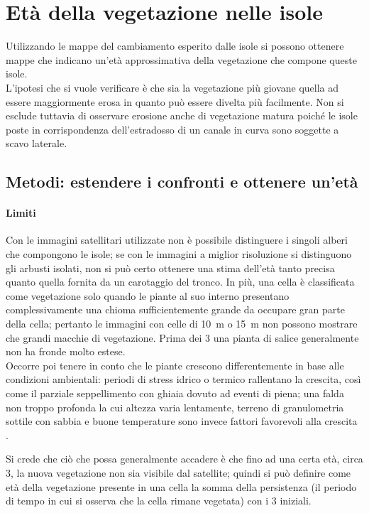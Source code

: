 \section{Età della vegetazione nelle isole}
Utilizzando le mappe del cambiamento esperito dalle isole si possono ottenere mappe che indicano un'età approssimativa della vegetazione che compone queste isole. 
\\
L'ipotesi che si vuole verificare è che sia la vegetazione più giovane quella ad essere maggiormente erosa in quanto può essere divelta più facilmente.
Non si esclude tuttavia di osservare erosione anche di vegetazione matura poiché le isole poste in corrispondenza dell'estradosso di un canale in curva sono soggette a scavo laterale.

\subsection{Metodi: estendere i confronti e ottenere un'età}
\paragraph{Limiti}
Con le immagini satellitari utilizzate non è possibile distinguere i singoli alberi che compongono le isole; se con le immagini a miglior risoluzione si distinguono gli arbusti isolati, non si può certo ottenere una stima dell'età tanto precisa quanto quella fornita da un carotaggio del tronco.
In più, una cella è classificata come vegetazione solo quando le piante al suo interno presentano complessivamente una chioma sufficientemente grande da occupare gran parte della cella; pertanto le immagini con celle di \SI{10}{\m} o  \SI{15}{\m} non possono mostrare che grandi macchie di vegetazione.
Prima dei \SI{3}{\anni} una pianta di salice generalmente non ha fronde molto estese.
\\
Occorre poi tenere in conto che le piante crescono differentemente in base alle condizioni ambientali: periodi di stress idrico o termico rallentano la crescita, così come il parziale seppellimento con ghiaia dovuto ad eventi di piena; una falda non troppo profonda la cui altezza varia lentamente, terreno di granulometria sottile con sabbia e buone temperature sono invece fattori favorevoli alla crescita .

Si crede che ciò che possa generalmente accadere è che fino ad una certa età, circa \SI{3}{\anni}, la nuova vegetazione non sia visibile dal satellite; quindi si può definire come età della vegetazione presente in una cella la somma della persistenza (il periodo di tempo in cui si osserva che la cella rimane vegetata) con i \SI{3}{\anni} iniziali. 

